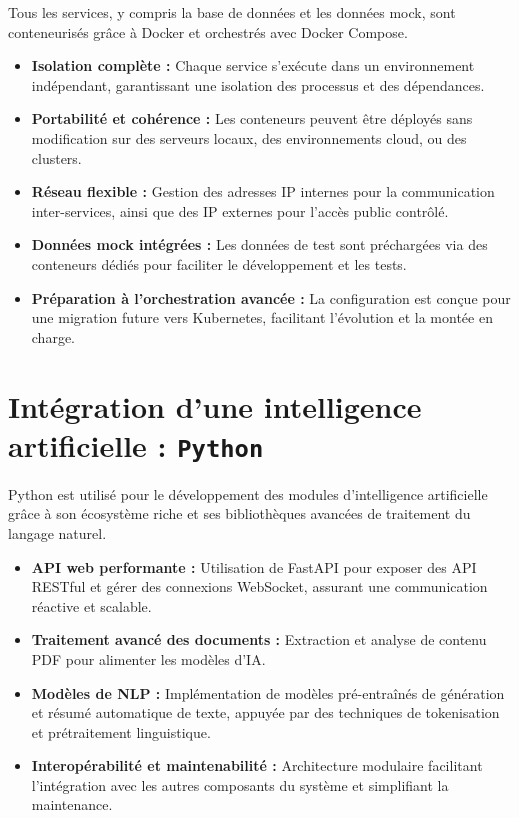 \documentclass{rapportPfe}
\begin{document}
Tous les services, y compris la base de données et les données mock, sont conteneurisés grâce à Docker et orchestrés avec Docker Compose.

\begin{itemize}
    \item \textbf{Isolation complète :} Chaque service s’exécute dans un environnement indépendant, garantissant une isolation des processus et des dépendances.
    \item \textbf{Portabilité et cohérence :} Les conteneurs peuvent être déployés sans modification sur des serveurs locaux, des environnements cloud, ou des clusters.
    \item \textbf{Réseau flexible :} Gestion des adresses IP internes pour la communication inter-services, ainsi que des IP externes pour l’accès public contrôlé.
    \item \textbf{Données mock intégrées :} Les données de test sont préchargées via des conteneurs dédiés pour faciliter le développement et les tests.
    \item \textbf{Préparation à l’orchestration avancée :} La configuration est conçue pour une migration future vers Kubernetes, facilitant l’évolution et la montée en charge.
\end{itemize}

\newpage
\section{Intégration d'une intelligence artificielle : \texttt{Python}}

Python est utilisé pour le développement des modules d’intelligence artificielle grâce à son écosystème riche et ses bibliothèques avancées de traitement du langage naturel.

\begin{itemize}
    \item \textbf{API web performante :} Utilisation de FastAPI pour exposer des API RESTful et gérer des connexions WebSocket, assurant une communication réactive et scalable.
    \item \textbf{Traitement avancé des documents :} Extraction et analyse de contenu PDF pour alimenter les modèles d’IA.
    \item \textbf{Modèles de NLP :} Implémentation de modèles pré-entraînés de génération et résumé automatique de texte, appuyée par des techniques de tokenisation et prétraitement linguistique.
    \item \textbf{Interopérabilité et maintenabilité :} Architecture modulaire facilitant l’intégration avec les autres composants du système et simplifiant la maintenance.
\end{itemize}
\end{document}
